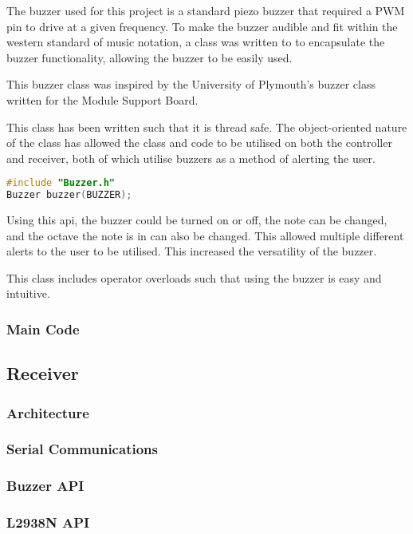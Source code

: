 \documentclass [11pt]{article}
\begin{document}
The buzzer used for this project is a standard piezo buzzer that required a PWM pin to drive at a given frequency. To make the buzzer audible and fit within the western standard of music notation, a class was written to to encapsulate the buzzer functionality, allowing the buzzer to be easily used. 

This buzzer class was inspired by the University of Plymouth's buzzer class written for the Module Support Board. 

This class has been written such that it is thread safe. The object-oriented nature of the class has allowed the class and code to be utilised on both the controller and receiver, both of which utilise buzzers as a method of alerting the user. 

\begin{lstlisting}[language=C++,label=code:buzzer_decleration,caption= Buzzer Class Constructor]
#include "Buzzer.h"
Buzzer buzzer(BUZZER);
\end{lstlisting}

Using this \gls{api}, the buzzer could be turned on or off, the note can be changed, and the octave the note is in can also be changed. This allowed multiple different alerts to the user to be utilised. This increased the versatility of the buzzer. 

This class includes operator overloads such that using the buzzer is easy and intuitive.

\subsubsection{Main Code}



\subsection{Receiver}
\subsubsection{Architecture}
\subsubsection{Serial Communications}
\subsubsection{Buzzer API}
\subsubsection{L2938N API}
\end{document}
